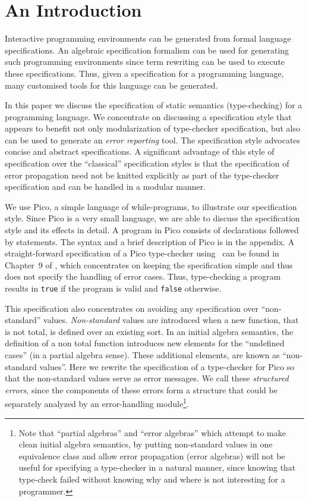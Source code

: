 \section{An Introduction}

Interactive programming environments can be generated from
formal language specifications. An algebraic specification
formalism can be used for generating such programming
environments since term rewriting can be used to execute
these specifications. Thus, given a specification for a
programming language, many customised tools for this
language can be generated.

In this paper we discuss the specification of static semantics
(type-checking) for a programming language. We concentrate
on discussing a specification style that appears to 
benefit not only modularization of type-checker specification,
but also can be used to generate an {\em error reporting} tool.
The specification style advocates concise and abstract
specifications. A significant advantage of this style of
specification over the ``classical'' specification styles
is that the specification of error propagation need not be knitted 
explicitly as part of the type-checker specification 
and can be handled in a modular manner.

We use Pico, a simple language of while-programs, to illustrate
our specification style. Since Pico is a very small language,
we are able to discuss the specification style and its effects in detail.
A program in Pico consists of declarations followed by statements. 
The syntax and a brief description of Pico is in the appendix.
A straight-forward specification of a Pico type-checker
using \asdf\ can be found in Chapter~9 of \cite{BHK89},
which concentrates on keeping the specification
simple and thus does not specify the handling of error cases. 
Thus, type-checking a program results in {\tt true} if the program
is valid and {\tt false} otherwise.

This specification also concentrates on
avoiding any specification over ``non-standard'' values.
{\em Non-standard} values are introduced when a new function,
that is not total, is defined over an existing sort.
In an initial algebra semantics,
the definition of a non total function introduces new elements
for the ``undefined cases'' (in a partial algebra sense).
These additional elements, are known as ``non-standard values''.
Here we rewrite the specification of a type-checker for Pico
so that the non-standard values serve as error messages.
We call these {\em structured errors}, since the components of
these errors form a structure that could be separately
analyzed by an error-handling module\footnote{
Note that ``partial algebras'' and ``error algebras'' which
attempt to make clean initial algebra semantics, by putting
non-standard values in one equivalence class and allow error
propagation (error algebras) will not be useful for specifying
a type-checker in a natural manner, since knowing that type-check
failed without knowing why and where is not interesting for
a programmer.}.

